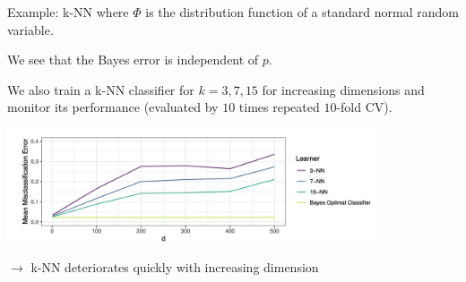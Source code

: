 \begin{vbframe}{Example: k-NN}
where $\Phi$ is the distribution function of a standard normal random variable. 

\lz 

We see that the Bayes error is independent of $p$. 


\framebreak

We also train a k-NN classifier for $k = 3, 7, 15$ for increasing dimensions and monitor its performance (evaluated by $10$ times repeated $10$-fold CV).
\medskip

\begin{center}
\includegraphics[width = 11cm ]{figure_man/knn_misclassification.png}
\end{center}

$\to$ k-NN deteriorates quickly with increasing dimension


\end{vbframe}


